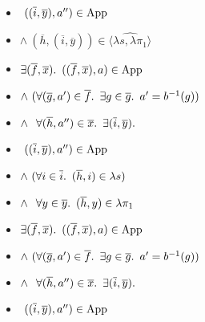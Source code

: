 \begin{itemize}
  \item[\phantom{\imps}]
    \quad\quad\quad\phantom{$\land$}$~((\overline{i},\overline{y}),a^{\prime\prime})\in\operatorname{App}$

  \item[\phantom{\imps}]
    \quad\quad\quad$\land~(\overline{h},(\overline{i},\overline{y}))\in\widehat{\langle\lambda s,\lambda\pi_1\rangle}$
  \addtolength{\itemsep}{.5\baselineskip}

  \item[\iffs]
    $\exists (\overline{f},\overline{x})\ldotp~((\overline{f},\overline{x}),a)\in\operatorname{App}$

  \addtolength{\itemsep}{-.5\baselineskip}
  \item[\phantom{\imps}]
    \quad $\land~(\forall (\overline{g},a^\prime)\in\overline{f}\ldotp~\exists g\in\overline{g}\ldotp~a^\prime = b^{-1}(g))$
  \item[\phantom{\imps}]
    \quad $\land~\phantom{(}\forall(\overline{h},a^{\prime\prime})\in\overline{x}\ldotp~\exists(\overline{i},\overline{y})\ldotp$

  \item[\phantom{\imps}]
    \quad\quad\quad\phantom{$\land$}$~((\overline{i},\overline{y}),a^{\prime\prime})\in\operatorname{App}$

  \item[\phantom{\imps}]
    \quad\quad\quad$\land~(\forall i\in\overline{i}\ldotp~(\overline{h},i)\in\lambda s)$

  \item[\phantom{\imps}]
    \quad\quad\quad$\land~\phantom{(}\forall y\in\overline{y}\ldotp~(\overline{h},y)\in\lambda\pi_1$
  \addtolength{\itemsep}{.5\baselineskip}

  \item[\iffs]
    $\exists (\overline{f},\overline{x})\ldotp~((\overline{f},\overline{x}),a)\in\operatorname{App}$

  \addtolength{\itemsep}{-.5\baselineskip}
  \item[\phantom{\imps}]
    \quad $\land~(\forall (\overline{g},a^\prime)\in\overline{f}\ldotp~\exists g\in\overline{g}\ldotp~a^\prime = b^{-1}(g))$
  \item[\phantom{\imps}]
    \quad $\land~\phantom{(}\forall(\overline{h},a^{\prime\prime})\in\overline{x}\ldotp~\exists(\overline{i},\overline{y})\ldotp$

  \item[\phantom{\imps}]
    \quad\quad\quad\phantom{$\land$}$~((\overline{i},\overline{y}),a^{\prime\prime})\in\operatorname{App}$


\end{itemize}
